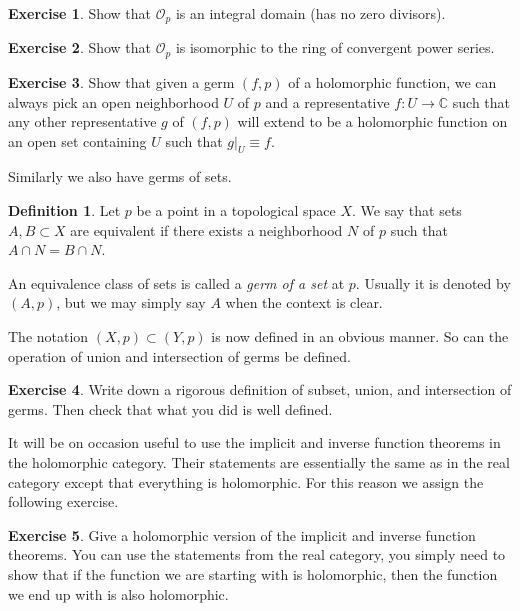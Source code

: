 \documentclass[12pt,openany]{book}
\newcommand{\C}{{\mathbb{C}}}
\newcommand{\sO}{{\mathcal{O}}}
\newcommand{\myindex}[1]{#1\index{#1}}
\theoremstyle{plain}
\theoremstyle{remark}
\theoremstyle{definition}
\newtheorem{defn}[thm]{Definition}
\theoremstyle{exercise}
\newtheorem{exercise}{Exercise}[section]
\theoremstyle{example}
\begin{document}
\begin{exercise}
Show that $\sO_p$ is an integral domain (has no zero divisors).
\end{exercise}

\begin{exercise}
Show that $\sO_p$ is isomorphic to the ring of convergent power series.
\end{exercise}

\begin{exercise}
Show that given a germ $(f,p)$ of a holomorphic function,
we can always pick an open neighborhood $U$
of $p$ and a representative $f \colon U \to \C$ such that any other
representative $g$
of $(f,p)$ will extend to be a holomorphic function on an open set containing
$U$ such that $g|_U \equiv f$.
\end{exercise}

Similarly we also have germs of sets.

\begin{defn}
Let $p$ be a point in a topological space $X$.
We say that sets $A, B \subset X$ are equivalent
if there exists a neighborhood $N$ of $p$
such that $A \cap N = B \cap N$.

An equivalence class of sets 
is called a \emph{\myindex{germ of a set}} at $p$.
Usually it is denoted by $(A,p)$, but we may simply say $A$ when
the context is clear.
\end{defn}

The notation $(X,p) \subset (Y,p)$ is now defined in an obvious manner.
So can the operation of union and intersection of germs be defined.

\begin{exercise}
Write down a rigorous definition of subset, union, and intersection of germs.
Then check that what you did is well defined.
\end{exercise}

It will be on occasion useful to use the implicit and inverse function
theorems in the holomorphic category.  Their statements are essentially the
same as in the real category except that everything is holomorphic.  For this
reason we assign the following exercise.

\begin{exercise}
Give a holomorphic version of the implicit and inverse function theorems.
You can use the statements from the real category, you simply need to show
that if the function we are starting with is holomorphic, then the function
we end up with is also holomorphic.
\end{exercise}
\end{document}
